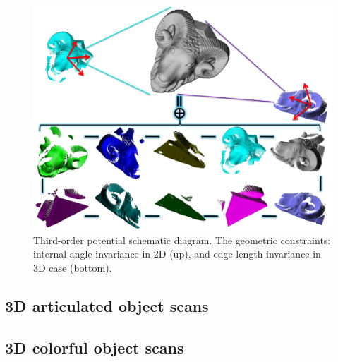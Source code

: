 \begin{figure}
\centering
  \includegraphics[width=1.0\linewidth]{figures/3DRigid.pdf}
  \caption{Third-order potential schematic diagram. The geometric constraints: internal angle invariance in 2D (up), and edge length invariance in 3D case (bottom).}
\label{fig:3DRigid}
\end{figure}

\subsection{3D articulated object scans}
\label{subsec:3darticulated}

\subsection{3D colorful object scans}
\label{subsec:3dColored}
